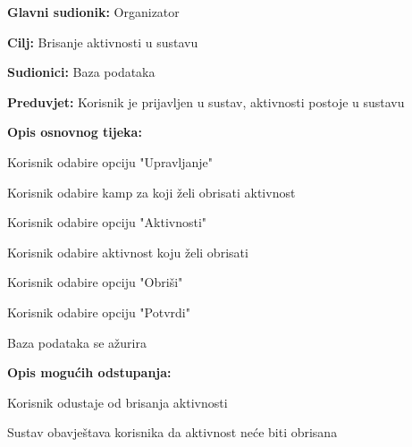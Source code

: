 					\noindent {}
					\begin{packed_item}
						
						\item \textbf{Glavni sudionik: }Organizator
						\item  \textbf{Cilj:} Brisanje aktivnosti u sustavu
						\item  \textbf{Sudionici:} Baza podataka
						\item  \textbf{Preduvjet:} Korisnik je prijavljen u sustav, aktivnosti postoje u sustavu
						\item  \textbf{Opis osnovnog tijeka:}
						
						\item[] \begin{packed_enum}
							
							\item Korisnik odabire opciju "Upravljanje"
							\item Korisnik odabire kamp za koji želi obrisati aktivnost
							\item Korisnik odabire opciju "Aktivnosti"
							\item Korisnik odabire aktivnost koju želi obrisati
							\item Korisnik odabire opciju "Obriši"
							\item Korisnik odabire opciju "Potvrdi"
							\item Baza podataka se ažurira
						\end{packed_enum}
						
						\item  \textbf{Opis mogućih odstupanja:}
						
						\item[] \begin{packed_item}
							
							\item[2.a] Korisnik odustaje od brisanja aktivnosti
							\item[] \begin{packed_enum}
								
								\item Sustav obavještava korisnika da aktivnost neće biti obrisana	
								
							\end{packed_enum}
							
							
						\end{packed_item}
					\end{packed_item}
					
